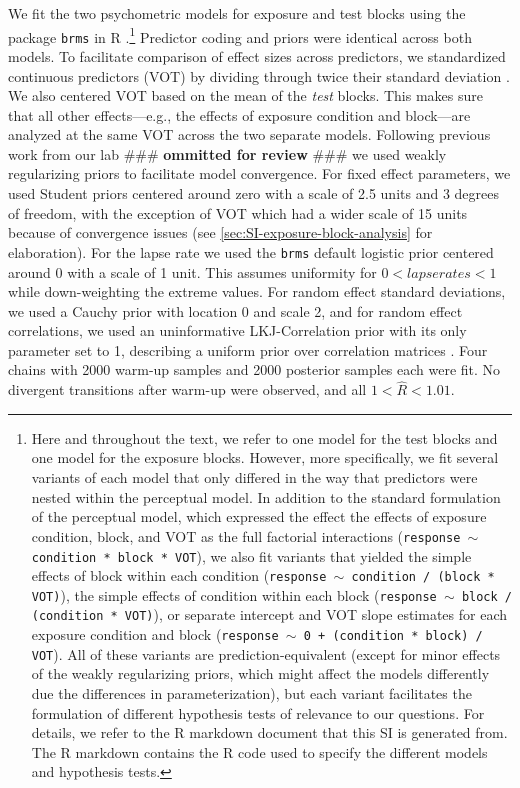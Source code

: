 \documentclass[
  11pt,
  man,mask,floatsintext]{apa6}
\begin{document}
We fit the two psychometric models for exposure and test blocks using the package \texttt{brms} \autocite{R-brms_a} in R \autocite{R,RStudio}.\footnote{Here and throughout the text, we refer to one model for the test blocks and one model for the exposure blocks. However, more specifically, we fit several variants of each model that only differed in the way that predictors were nested within the perceptual model. In addition to the standard formulation of the perceptual model, which expressed the effect the effects of exposure condition, block, and VOT as the full factorial interactions (\texttt{response $\sim$ condition * block * VOT}), we also fit variants that yielded the simple effects of block within each condition (\texttt{response $\sim$ condition / (block * VOT)}), the simple effects of condition within each block (\texttt{response $\sim$ block / (condition * VOT)}), or separate intercept and VOT slope estimates for each exposure condition and block (\texttt{response $\sim$ 0 + (condition * block) / VOT}). All of these variants are prediction-equivalent (except for minor effects of the weakly regularizing priors, which might affect the models differently due the differences in parameterization), but each variant facilitates the formulation of different hypothesis tests of relevance to our questions. For details, we refer to the R markdown document that this SI is generated from. The R markdown contains the R code used to specify the different models and hypothesis tests.} Predictor coding and priors were identical across both models. To facilitate comparison of effect sizes across predictors, we standardized continuous predictors (VOT) by dividing through twice their standard deviation \autocite{gelman2008}. We also centered VOT based on the mean of the \emph{test} blocks. This makes sure that all other effects---e.g., the effects of exposure condition and block---are analyzed at the same VOT across the two separate models. Following previous work from our lab \#\#\# \textbf{ommitted for review} \#\#\# we used weakly regularizing priors to facilitate model convergence. For fixed effect parameters, we used Student priors centered around zero with a scale of 2.5 units \autocite[following][]{gelman-prior2008} and 3 degrees of freedom, with the exception of VOT which had a wider scale of 15 units because of convergence issues (see \ref{sec:SI-exposure-block-analysis} for elaboration). For the lapse rate we used the \texttt{brms} default logistic prior centered around 0 with a scale of 1 unit. This assumes uniformity for \(0 < lapse rates < 1\) while down-weighting the extreme values. For random effect standard deviations, we used a Cauchy prior with location 0 and scale 2, and for random effect correlations, we used an uninformative LKJ-Correlation prior with its only parameter set to 1, describing a uniform prior over correlation matrices \autocite{lewandowski2009}. Four chains with 2000 warm-up samples and 2000 posterior samples each were fit. No divergent transitions after warm-up were observed, and all \(1 < \hat{R} < 1.01\).
\end{document}
